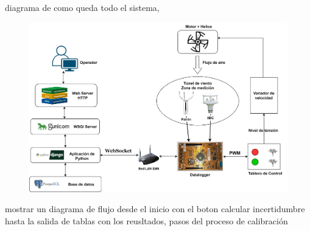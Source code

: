 diagrama de como queda todo el sistema, 
\begin{figure}[H]
    \centering
    \includegraphics[width=0.9\linewidth]{Figuras/AplicacionWeb/integracionHardware/DiagramaSistemaDesarrollar.png}
    \caption{}
    \label{fig:}
\end{figure}


mostrar un diagrama de flujo desde el inicio con el boton calcular incertidumbre hasta la salida de tablas con los reusltados, pasos del proceso de calibración


